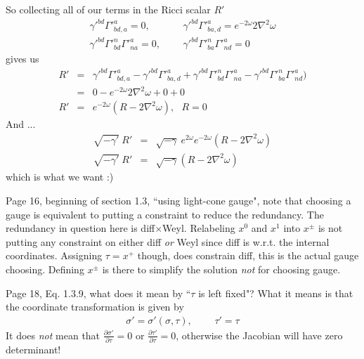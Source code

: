 \documentclass[aps,preprint,preprintnumbers,nofootinbib,showpacs,prd]{revtex4-1}
\newcommand{\nbea}{\begin{eqnarray*}}
\newcommand{\neea}{\end{eqnarray*}}
\begin{document}
So collecting all of our terms in the Ricci scalar $R'$
%
\nbea
\gamma'^{bd} \Gamma'^a_{bd,a} = 0, & ~~~ & \gamma'^{bd} \Gamma'^a_{ba,d} = e^{-2\omega}2 \nabla^2 \omega \\
\gamma'^{bd} \Gamma'^{n}_{bd}\Gamma'^{a}_{na} = 0, & ~~~ & \gamma'^{bd} \Gamma'^{n}_{ba}\Gamma'^{a}_{nd} = 0 
\neea
%
gives us
%
\nbea
R' & = & \gamma'^{bd} \Gamma'^a_{bd,a} - \gamma'^{bd} \Gamma'^a_{ba,d} + \gamma'^{bd} \Gamma'^{n}_{bd}\Gamma'^{a}_{na} - \gamma'^{bd} \Gamma'^{n}_{ba}\Gamma'^{a}_{nd} ) \\
& = & 0 - e^{-2\omega} 2 \nabla^2 \omega + 0 + 0 \\
R' & = & e^{-2\omega} (R - 2 \nabla^2 \omega), ~~~ R = 0
\neea
%
And ...
%
\nbea
\sqrt{-\gamma'}~R' & = & \sqrt{-\gamma}~e^{2 \omega} e^{-2\omega} (R - 2 \nabla^2 \omega) \\
\sqrt{-\gamma'}~R' & = & \sqrt{-\gamma} (R - 2 \nabla^2 \omega)
\neea
%
which is what we want :)

Page 16, beginning of section 1.3, ``using light-cone gauge", note that choosing a gauge is equivalent to putting a constraint to reduce the redundancy. The redundancy in question here is diff$\times$Weyl. Relabeling $x^0$ and $x^1$ into $x^\pm$ is not putting any constraint on either diff {\it or} Weyl since diff is w.r.t. the internal coordinates. Assigning $\tau = x^+$ though, does constrain diff, this is the actual gauge choosing. Defining $x^\pm$ is there to simplify the solution {\it not} for choosing gauge.

Page 18, Eq. 1.3.9, what does it mean by ``$\tau$ is left fixed"? What it means is that the coordinate transformation is given by
%
\nbea
\sigma' = \sigma'(\sigma, \tau), &~~~& \tau' = \tau
\neea
%
It does {\it not} mean that $\frac{\partial \sigma'}{\partial \tau} = 0$ or $\frac{\partial \tau'}{\partial \tau} = 0$, otherwise the Jacobian will have zero determinant!
\end{document}
